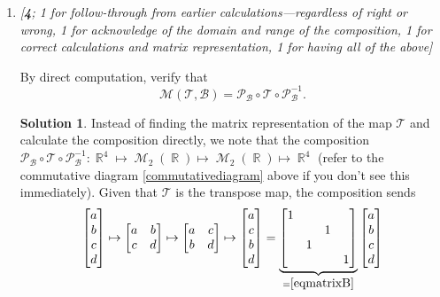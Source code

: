 \documentclass{amsart}
\theoremstyle{definition}
\theoremstyle{definition}
\newtheorem*{solution}{Solution}
\DeclareMathOperator{\R}{\mathbb{R}}
\DeclareMathOperator{\1}{\mathbbm{1}}
\DeclareMathOperator{\MM}{\mathcal{M}}
\newcommand{\Tau}{\mathcal{T}}
\begin{document}
\begin{enumerate}[itemsep = 2mm]
\begin{enumerate}[label=\arabic*.]
			\item \textit{[\textbf{4}; 1 for follow-through from earlier calculations---regardless of right or wrong, 1 for acknowledge of the domain and range of the composition, 1 for correct calculations and matrix representation, 1 for having all of the above]}
			
			By direct computation, verify that 
			\begin{equation*}
			\mathcal{M}(\mathcal{T},\mathcal{B})=\mathcal{P}_{\mathcal{B}}\circ \Tau \circ \mathcal{P}_{\mathcal{B}}^{-1}.
			\end{equation*}
			
			\begin{solution}
				Instead of finding the matrix representation of the map $\Tau$ and calculate the composition directly, we note that the composition $\mathcal{P}_{\mathcal{B}}\circ \Tau \circ \mathcal{P}_{\mathcal{B}}^{-1} : \R^4 \mapsto \MM_{2}(\R) \mapsto \MM_{2}(\R) \mapsto \R^4$ (refer to the commutative diagram \eqref{commutativediagram} above if you don't see this immediately). Given that $\Tau$ is the transpose map, the composition sends
				\begin{align*}
					\begin{bmatrix}
					a \\ b \\ c \\ d
					\end{bmatrix} \mapsto \begin{bmatrix}
					a&b\\
					c&d
					\end{bmatrix} \mapsto \begin{bmatrix}
					a&c\\
					b&d
					\end{bmatrix} \mapsto \begin{bmatrix}
					a \\ c \\ b \\ d
					\end{bmatrix} = \underbrace{\begin{bmatrix}
					1 & & & \\ & & 1 & \\ & 1 & & \\ & & & 1
					\end{bmatrix}}_{=\eqref{eqmatrixB}} \begin{bmatrix}
					a \\ b \\ c \\ d
					\end{bmatrix}
				\end{align*}
			\end{solution}
		\end{enumerate}
		
		\end{enumerate}
	
\end{document}
